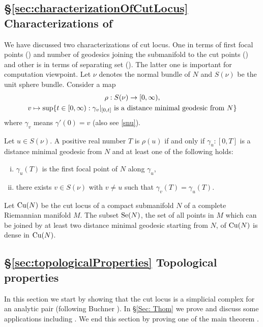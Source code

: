 \subsection*{\S\ref{sec:characterizationOfCutLocus} Characterizations of \texorpdfstring{\cutn}{Cu(N)}}
\hfb We have discussed two characterizations of cut locus. One in terms of first focal points () and number of geodesics joining the submanifold to the cut points () and other is in terms of separating set (). The latter one is important for computation viewpoint. Let $\nu$\index{$\nu$} denotes the normal bundle of $N$ and $S(\nu)$ be the unit sphere bundle. Consider a map
\begin{gather*}
    \rho:S(\nu) \to [0,\infty),\\
    v\mapsto \sup\{t\in[0,\infty):\gamma_v|_{[0,t]} \text{ is a distance minimal geodesic from $N$}\}\index{$\rho$}
\end{gather*}
where $\gamma_v$  means $\gamma'(0)=v$ (also see \eqref{snu}).

\begin{thmSec}
    Let $u\in S(\nu)$. A positive real number $T$ is $\rho(u)$ if and only if $\gamma_u:[0,T]$ is a distance minimal geodesic from $N$ and at least one of the following holds:
    \begin{enumerate}[(i)]
        \item $\gamma_u(T)$ is the first focal point of $N$ along $\gamma_u$,
        \item there exists $v\in S(\nu)$ with $v\neq u$ such that $\gamma_v(T)=\gamma_u(T)$.
    \end{enumerate}
\end{thmSec}

\vspace{0.3cm}
\begin{thmSec}
    Let $\mathrm{Cu}(N)$\index{\cutn} be the cut locus of a compact submanifold $N$  of a  complete Riemannian manifold $M$. The subset $\mathrm{Se}(N)$,\index{\sen} the set of all points in $M$ which can be joined by at least two distance minimal geodesic starting from $N$,  of $\mathrm{Cu}(N)$ is dense in $\mathrm{Cu}(N)$.
\end{thmSec}

\subsection*{\S\ref{sec:topologicalProperties} Topological properties}
\hfb In this section we start by showing that the cut locus is a simplicial complex for an analytic pair (following Buchner \cite{Buc77}). In \S \ref{Sec: Thom} we prove  and discuss some applications including . We end this section by proving one of the main theorem .

